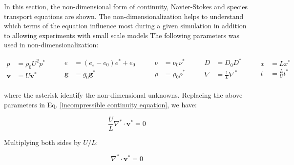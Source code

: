 In this section, the non-dimensional form
of continuity, Navier-Stokes and
species transport equations are shown.
The non-dimensionalization helps to understand 
which terms of the equation influence most during 
a given simulation in addition to allowing experiments 
with small scale models 
The following parameters was used in non-dimensionalization:

\begin{equation}
 \begin{aligned}
  p & = \rho_{0} U^{2} p^{*} \\[10pt]
 \textbf{v} & = U \textbf{v}^{*} \\
 \end{aligned}
 \qquad
 \begin{aligned}
 e & = ( e_{s} - e_{0} ) e^{*} + e_{0}\\[10pt]
 \textbf{g} & = g_{0} \textbf{g}^{*} \\
 \end{aligned}
 \qquad
 \begin{aligned}
 \nu & = \nu_{0} \nu^{*} \\[10pt]
 \rho & = \rho_{0} \rho^{*} \\
 \end{aligned}
 \qquad
 \begin{aligned}
 D & = D_{0} D^{*} \\[5pt]
 \nabla & = \frac{1}{L} \nabla^{*} \\
 \end{aligned}
 \qquad
 \begin{aligned}
 x & = L x^{*} \\[5pt]
 t & = \frac{L}{U} t^{*} \\
 \end{aligned}
 \nonumber
\end{equation}


\medskip
\noindent
where the asterisk identify the non-dimensional unknowns.
Replacing the above parameters in Eq. \ref{incompressible
continuity equation}, we have:

\begin{equation}
 \frac{U}{L} \nabla^{*} \cdot \textbf{v}^{*} = 0
\end{equation}

\medskip
\noindent
Multiplying both sides by $U/L$:

\begin{equation} \label{continuidade adimensional 1}
 \nabla^{*} \cdot \textbf{v}^{*} = 0
\end{equation}

